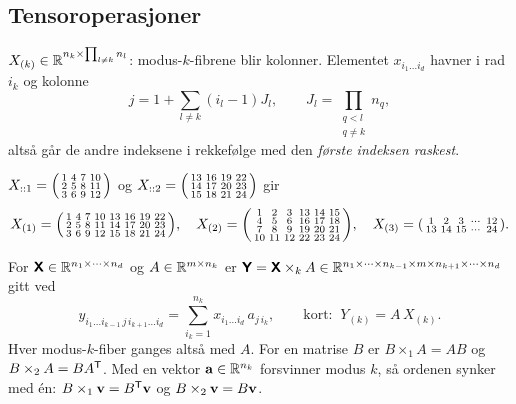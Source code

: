 \subsection{Tensoroperasjoner}
\begin{defn}
$X_{(k)}\in\mathbb{R}^{n_k\times\prod_{l\neq k}n_l}$: modus-$k$-fibrene blir kolonner. Elementet $x_{i_1\dots i_d}$ havner i rad $i_k$ og kolonne
\[
j=1+\sum_{l\neq k}(i_l-1)J_l,\qquad J_l=\prod_{\substack{q<l\\ q\neq k}}n_q,
\]
altså går de andre indeksene i rekkefølge med den \emph{første indeksen raskest}.
\end{defn}
\begin{eksempel}
$X_{::1}=\begin{psmallmatrix}1&4&7&10\\2&5&8&11\\3&6&9&12\end{psmallmatrix}$ og $X_{::2}=\begin{psmallmatrix}13&16&19&22\\14&17&20&23\\15&18&21&24\end{psmallmatrix}$ gir
\[
X_{(1)}=\begin{psmallmatrix}1&4&7&10&13&16&19&22\\2&5&8&11&14&17&20&23\\3&6&9&12&15&18&21&24\end{psmallmatrix},\quad
X_{(2)}=\begin{psmallmatrix}1&2&3&13&14&15\\4&5&6&16&17&18\\7&8&9&19&20&21\\10&11&12&22&23&24\end{psmallmatrix},\quad
X_{(3)}=\begin{psmallmatrix}1&2&3&\cdots&12\\13&14&15&\cdots&24\end{psmallmatrix}.
\]
\end{eksempel}

\begin{defn}[$k$-modusprodukt]
For $\bm{\mathsf{X}}\in\mathbb{R}^{n_1\times\dots\times n_d}$ og $A\in\mathbb{R}^{m\times n_k}$ er $\bm{\mathsf{Y}}=\bm{\mathsf{X}}\times_k A\in\mathbb{R}^{n_1\times\dots\times n_{k-1}\times m\times n_{k+1}\times\dots\times n_d}$ gitt ved
\[
y_{i_1\dots i_{k-1}\,j\,i_{k+1}\dots i_d}=\sum_{i_k=1}^{n_k}x_{i_1\dots i_d}\,a_{j\,i_k},\qquad\text{kort: }\ Y_{(k)}=A\,X_{(k)}.
\]
Hver modus-$k$-fiber ganges altså med $A$. For en matrise $B$ er $B\times_1A=AB$ og $B\times_2A=BA^{\mathsf{T}}$. Med en vektor $\mathbf{a}\in\mathbb{R}^{n_k}$ forsvinner modus $k$, så ordenen synker med én: $B\times_1\mathbf{v}=B^{\mathsf{T}}\mathbf{v}$ og $B\times_2\mathbf{v}=B\mathbf{v}$.
\end{defn}

